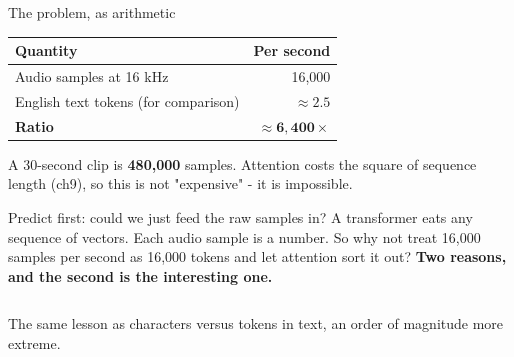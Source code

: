 \documentclass[aspectratio=169]{beamer}
\begin{document}
\begin{frame}{The problem, as arithmetic}
  \small
  \begin{center}
    \begin{tabular}{lr}
      \toprule
      \textbf{Quantity} & \textbf{Per second} \\
      \midrule
      Audio samples at 16 kHz & 16,000 \\
      English text tokens (for comparison) & $\approx 2.5$ \\
      \midrule
      \rowcolor{armred!12}
      \textbf{Ratio} & $\mathbf{\approx 6{,}400\times}$ \\
      \bottomrule
    \end{tabular}
  \end{center}
  \vskip 8pt
  A 30-second clip is \textbf{480,000} samples. Attention costs the square of sequence length
  (ch9), so this is not "expensive" - it is impossible.
  \vskip 8pt
\end{frame}

\begin{frame}{Predict first: could we just feed the raw samples in?}
  \small
  A transformer eats any sequence of vectors. Each audio sample is a number. So why not treat
  16,000 samples per second as 16,000 tokens and let attention sort it out?
  \vskip 10pt
  \pause
  \textbf{Two reasons, and the second is the interesting one.}
  \vskip 6pt
  \begin{columns}[T]
  \end{columns}
  \vskip 8pt
  \centering
  The same lesson as characters versus tokens in text, an order of magnitude more extreme.
\end{frame}
\end{document}
